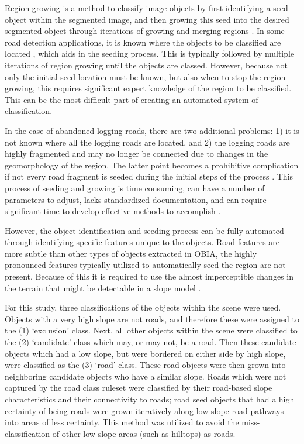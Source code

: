 \documentclass[remotesensing,article,submit,pdftex,moreauthors]{Definitions/mdpi}
\begin{document}
Region growing is a method to classify image objects by first identifying a seed object within the segmented image, and then growing this seed into the desired segmented object through iterations of growing and merging regions \cite{benz}. In some road detection applications, it is known where the objects to be classified are located \cite{li}, which aids in the seeding process. This is typically followed by multiple iterations of region growing until the objects are classed. However, because not only the initial seed location must be known, but also when to stop the region growing, this requires significant expert knowledge of the region to be classified. This can be the most difficult part of creating an automated system of classification.

In the case of abandoned logging roads, there are two additional problems: 1) it is not known where all the logging roads are located, and 2) the logging roads are highly fragmented and may no longer be connected due to changes in the geomorphology of the region. The latter point becomes a prohibitive complication if not every road fragment is seeded during the initial steps of the process \cite{li}. This process of seeding and growing is time consuming, can have a number of parameters to adjust, lacks standardized documentation, and can require significant time to develop effective methods to accomplish \cite{idrees}. 

However, the object identification and seeding process can be fully automated through identifying specific features unique to the objects.   Road features are more   subtle than other types of objects extracted in OBIA, the highly pronounced features typically utilized to automatically seed the region are not present. Because of this it is required to use the almost imperceptible changes in the terrain that might be detectable in a slope model \cite{luca, erikson, sherba, zhen}.

For this study, three classifications of the objects within the scene were used. Objects with a very high slope are not roads, and therefore these were assigned to the (1) ‘exclusion’ class. Next, all other objects within the scene were classified to the (2) ‘candidate’ class which may, or may not, be a road. Then these candidate objects   which had a low slope, but were bordered on either side by high slope, were classified as the (3) ‘road’ class. These road objects were then grown into   neighboring candidate objects who have a similar slope. Roads which were not captured by the road class ruleset were classified by their road-based slope characteristics and their connectivity to roads; road seed objects that had a high certainty of being roads were grown iteratively along low slope road pathways into areas of less certainty.   This method was utilized to avoid the miss-classification of other low slope areas (such as hilltops) as roads.  
\end{document}
